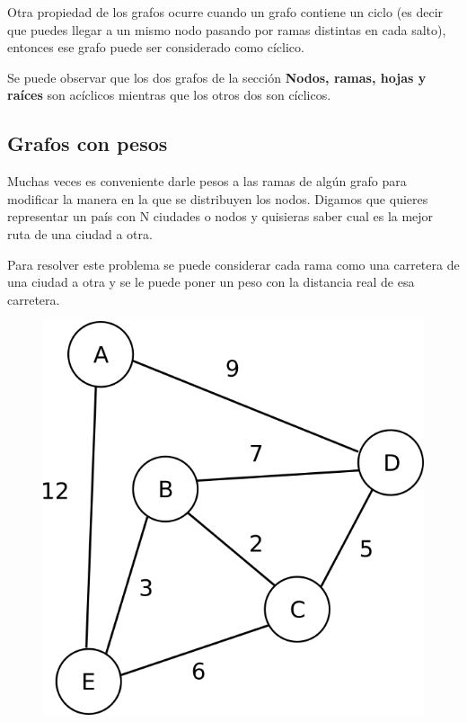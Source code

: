 \documentclass{article}
\begin{document}
Otra propiedad de los grafos ocurre cuando un grafo contiene un ciclo (es decir que puedes llegar a un mismo nodo pasando por ramas distintas en cada salto), entonces ese grafo puede ser considerado como cíclico.

Se puede observar que los dos grafos de la sección \textbf{Nodos, ramas, hojas y raíces} son acíclicos mientras que los otros dos son cíclicos.

\subsection{Grafos con pesos}

Muchas veces es conveniente darle pesos a las ramas de algún grafo para modificar la manera en la que se distribuyen los nodos. Digamos que quieres representar un país con N ciudades o nodos y quisieras saber cual es la mejor ruta de una ciudad a otra.

Para resolver este problema se puede considerar cada rama como una carretera de una ciudad a otra y se le puede poner un peso con la distancia real de esa carretera.

\begin{figure}[H]
    \centering
    \includegraphics[width=0.2\paperwidth]{ciudades}
\end{figure}
\end{document}
